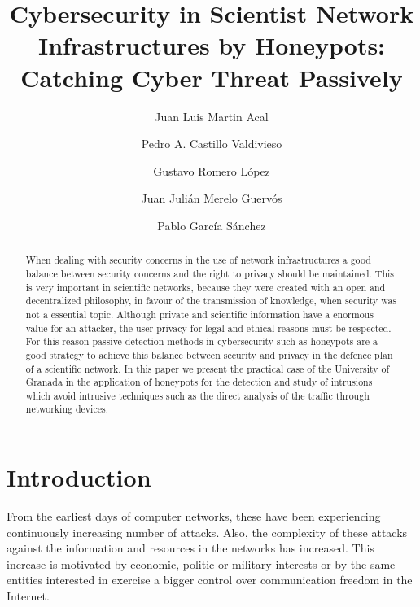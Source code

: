 \documentclass[a4paper]{llncs}
\begin{document}
	
	\pagestyle{empty}
	
	\mainmatter
	
	\title{Cybersecurity in Scientist Network Infrastructures by
		Honeypots: Catching Cyber Threat Passively}
	
	\author{Juan Luis Martin Acal \and Pedro A. Castillo Valdivieso \and Gustavo Romero López \and Juan Julián Merelo Guervós \and Pablo García Sánchez }
	
	
	
	\maketitle

\begin{abstract}
When dealing with security concerns in the use of network infrastructures a good balance between security concerns and the right to privacy should be maintained. This is very important in scientific networks, because they were created with an open and decentralized philosophy, in favour of the transmission of knowledge, when security was not a essential topic.
Although private and scientific information have a enormous value for an attacker, the user privacy for legal and ethical reasons must be respected. For this reason passive detection methods in cybersecurity such as honeypots are a good strategy to achieve this balance between security and privacy in the defence plan of a scientific network. In this paper we present the practical case of the University of Granada in the application of honeypots for the detection and study of intrusions which avoid intrusive techniques such as the direct analysis of the traffic through networking devices. 
\end{abstract}


\section{Introduction}
From the earliest days of computer networks, these have been experiencing continuously increasing number of attacks\cite{esset-tendencias,cni-ccn-tendencias-2014,cni-ccn-tendencias-2015}. Also, the complexity of these attacks against the information and resources in the networks has increased. This increase is motivated by  economic, politic or military interests or by the same entities interested in exercise a bigger control over communication freedom in the Internet\cite{cni-ccn-tendencias-2015,cisco-2014}.
\end{document}

